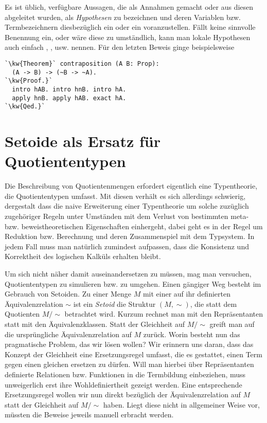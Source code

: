 Es ist üblich, verfügbare Aussagen, die als Annahmen gemacht
oder aus diesen abgeleitet wurden, als \emph{Hypothesen} zu bezeichnen
und deren Variablen bzw. Termbezeichnern diesbezüglich ein  oder
ein  voranzustellen. Fällt keine sinnvolle Benennung ein,
oder wäre diese zu umständlich, kann man lokale Hypothesen auch
einfach , ,  usw. nennen. Für den letzten
Beweis ginge beispielsweise

\begin{lstlisting}[escapechar=`, xleftmargin=\mathindent]
`\kw{Theorem}` contraposition (A B: Prop):
  (A -> B) -> (~B -> ~A).
`\kw{Proof.}`
  intro hAB. intro hnB. intro hA.
  apply hnB. apply hAB. exact hA.
`\kw{Qed.}`
\end{lstlisting}

\newpage
\section{Setoide als Ersatz für Quotiententypen}

Die Beschreibung von Quotientenmengen erfordert eigentlich eine
Typentheorie, die Quotiententypen umfasst. Mit diesen verhält es sich
allerdings schwierig, dergestalt dass die naive Erweiterung einer
Typentheorie um solche zuzüglich zugehöriger Regeln unter Umständen mit
dem Verlust von bestimmten meta- bzw. beweistheoretischen Eigenschaften
einhergeht, dabei geht es in der Regel um Reduktion bzw. Berechnung und
deren Zusammenspiel mit dem Typsystem. In jedem Fall muss man natürlich
zumindest aufpassen, dass die Konsistenz und Korrektheit des logischen
Kalküls erhalten bleibt.

Um sich nicht näher damit auseinandersetzen zu müssen, mag man versuchen,
Quotiententypen zu simulieren bzw. zu umgehen. Einen gängiger Weg
besteht im Gebrauch von Setoiden. Zu einer Menge $M$ mit einer auf ihr
definierten Äquivalenzrelation $\sim$ ist ein \emph{Setoid} die Struktur
$(M,\sim)$, die statt dem Quotienten $M/{\sim}$ betrachtet wird. Kurzum
rechnet man mit den Repräsentanten statt mit den Äquivalenzklassen.
Statt der Gleichheit auf $M/{\sim}$ greift man auf die ursprüngliche
Äquivalenzrelation auf $M$ zurück. Worin besteht nun
das pragmatische Problem, das wir lösen wollen? Wir erinnern uns daran,
dass das Konzept der Gleichheit eine Ersetzungsregel umfasst, die es
gestattet, einen Term gegen einen gleichen ersetzen zu dürfen. Will man
hierbei über Repräsentanten definierte Relationen bzw. Funktionen in die
Termbildung einbeziehen, muss unweigerlich erst ihre Wohldefiniertheit
gezeigt werden. Eine entsprechende Ersetzungsregel wollen wir nun direkt
bezüglich der Äquivalenzrelation auf $M$ statt der Gleichheit auf
$M/{\sim}$ haben. Liegt diese nicht in allgemeiner Weise vor, müssten
die Beweise jeweils manuell erbracht werden.


